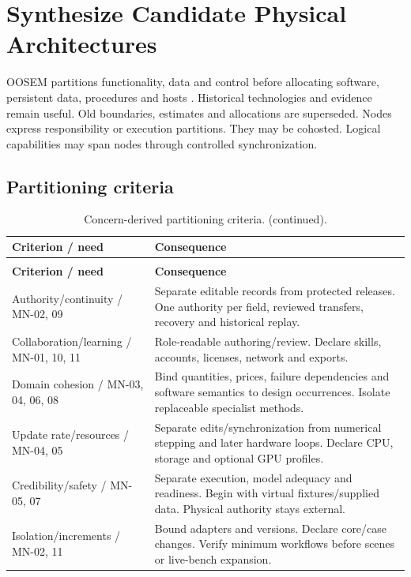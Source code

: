 \section{Synthesize Candidate Physical Architectures}
\label{section:synthesize-physical-architectures}

OOSEM partitions functionality, data and control before allocating software, persistent data, procedures and hosts \citep[Sec.~17.3.5]{friedenthal2014practical}. Historical technologies and evidence remain useful. Old boundaries, estimates and allocations are superseded. Nodes express responsibility or execution partitions. They may be cohosted. Logical capabilities may span nodes through controlled synchronization.

\subsection{Partitioning criteria}
{\small
\setlength{\tabcolsep}{4pt}
\setlength{\parskip}{0pt}
\setlength{\LTpre}{0.4\baselineskip}
\setlength{\LTpost}{0.4\baselineskip}
\renewcommand{\arraystretch}{1.06}
\begin{longtable}{@{}>{\raggedright\arraybackslash}p{}>{\raggedright\arraybackslash}p{}@{}}
\caption{Concern-derived partitioning criteria.}\label{tab:framework-partitioning}\\
\toprule
\textbf{Criterion / need} & \textbf{Consequence} \\
\midrule
\endfirsthead
\caption[]{Concern-derived partitioning criteria. (continued).}\\
\toprule
\textbf{Criterion / need} & \textbf{Consequence} \\
\midrule
\endhead
\bottomrule
\endfoot
Authority/continuity / MN-02, 09 & Separate editable records from protected releases. One authority per field, reviewed transfers, recovery and historical replay. \\
Collaboration/learning / MN-01, 10, 11 & Role-readable authoring/review. Declare skills, accounts, licenses, network and exports. \\
Domain cohesion / MN-03, 04, 06, 08 & Bind quantities, prices, failure dependencies and software semantics to design occurrences. Isolate replaceable specialist methods. \\
Update rate/resources / MN-04, 05 & Separate edits/synchronization from numerical stepping and later hardware loops. Declare CPU, storage and optional GPU profiles. \\
Credibility/safety / MN-05, 07 & Separate execution, model adequacy and readiness. Begin with virtual fixtures/supplied data. Physical authority stays external. \\
Isolation/increments / MN-02, 11 & Bound adapters and versions. Declare core/case changes. Verify minimum workflows before scenes or live-bench expansion. \\
\end{longtable}
}

